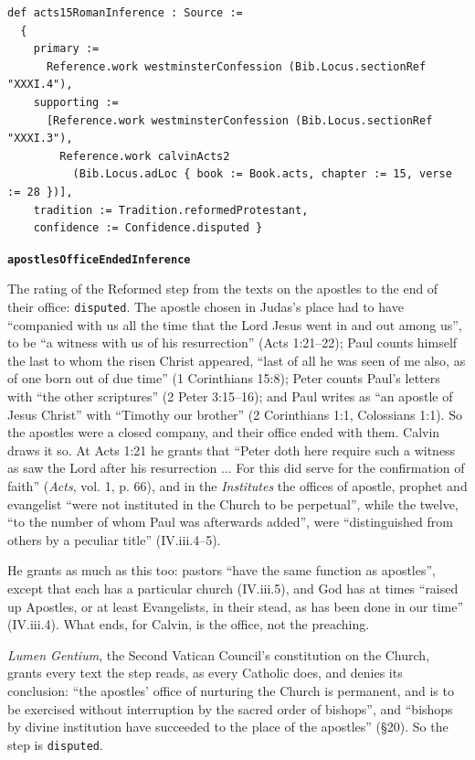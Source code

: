 \documentclass[11pt]{article}
\begin{document}
{\small\begin{verbatim}
def acts15RomanInference : Source :=
  {
    primary :=
      Reference.work westminsterConfession (Bib.Locus.sectionRef "XXXI.4"),
    supporting :=
      [Reference.work westminsterConfession (Bib.Locus.sectionRef "XXXI.3"),
        Reference.work calvinActs2
          (Bib.Locus.adLoc { book := Book.acts, chapter := 15, verse := 28 })],
    tradition := Tradition.reformedProtestant,
    confidence := Confidence.disputed }
\end{verbatim}}
\par\medskip\noindent\textbf{\texttt{apostles\allowbreak{}Office\allowbreak{}Ended\allowbreak{}Inference}}\par\nobreak\noindent
The rating of the Reformed step from the texts on the apostles to the end of their office: \texttt{disputed}. The apostle chosen in Judas’s place had to have “companied with us all the time that the Lord Jesus went in and out among us”, to be “a witness with us of his resurrection” (Acts 1:21–22); Paul counts himself the last to whom the risen Christ appeared, “last of all he was seen of me also, as of one born out of due time” (1 Corinthians 15:8); Peter counts Paul’s letters with “the other scriptures” (2 Peter 3:15–16); and Paul writes as “an apostle of Jesus Christ” with “Timothy our brother” (2 Corinthians 1:1, Colossians 1:1). So the apostles were a closed company, and their office ended with them. Calvin draws it so. At Acts 1:21 he grants that “Peter doth here require such a witness as saw the Lord after his resurrection ... For this did serve for the confirmation of faith” (\emph{Acts}, vol. 1, p. 66), and in the \emph{Institutes} the offices of apostle, prophet and evangelist “were not instituted in the Church to be perpetual”, while the twelve, “to the number of whom Paul was afterwards added”, were “distinguished from others by a peculiar title” (IV.iii.4–5).

He grants as much as this too: pastors “have the same function as apostles”, except that each has a particular church (IV.iii.5), and God has at times “raised up Apostles, or at least Evangelists, in their stead, as has been done in our time” (IV.iii.4). What ends, for Calvin, is the office, not the preaching.

\emph{Lumen Gentium}, the Second Vatican Council’s constitution on the Church, grants every text the step reads, as every Catholic does, and denies its conclusion: “the apostles’ office of nurturing the Church is permanent, and is to be exercised without interruption by the sacred order of bishops”, and “bishops by divine institution have succeeded to the place of the apostles” (§20). So the step is \texttt{disputed}.
\end{document}
